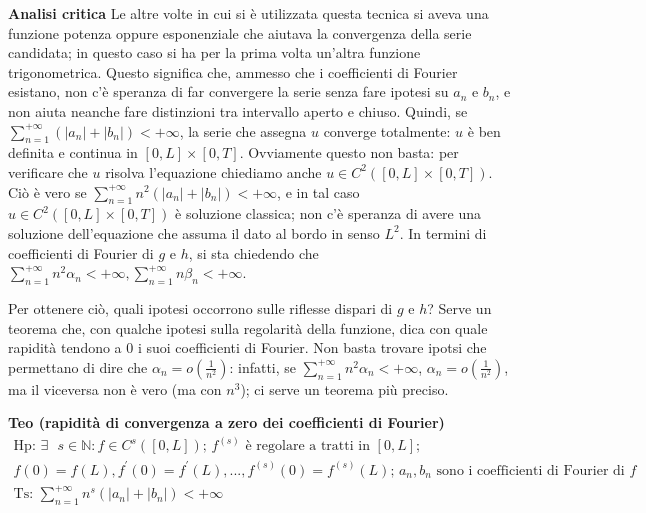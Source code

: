 \documentclass{article}
\begin{document}
\textbf{Analisi critica} Le altre volte in cui si \`{e} utilizzata questa
tecnica si aveva una funzione potenza oppure esponenziale che aiutava la
convergenza della serie candidata; in questo caso si ha per la prima volta
un'altra funzione trigonometrica. Questo significa che, ammesso che i
coefficienti di Fourier esistano, non c'\`{e} speranza di far convergere la
serie senza fare ipotesi su $a_{n}$ e $b_{n}$, e non aiuta neanche fare
distinzioni tra intervallo aperto e chiuso. Quindi, se $\sum_{n=1}^{+\infty
}\left( \left\vert a_{n}\right\vert +\left\vert b_{n}\right\vert \right)
<+\infty $, la serie che assegna $u$ converge totalmente: $u$ \`{e} ben
definita e continua in $\left[ 0,L\right] \times \left[ 0,T\right] $.
Ovviamente questo non basta: per verificare che $u$ risolva l'equazione
chiediamo anche $u\in C^{2}\left( \left[ 0,L\right] \times \left[ 0,T\right]
\right) $. Ci\`{o} \`{e} vero se $\sum_{n=1}^{+\infty }n^{2}\left(
\left\vert a_{n}\right\vert +\left\vert b_{n}\right\vert \right) <+\infty $,
e in tal caso $u\in C^{2}\left( \left[ 0,L\right] \times \left[ 0,T\right]
\right) $ \`{e} soluzione classica; non c'\`{e} speranza di avere una
soluzione dell'equazione che assuma il dato al bordo in senso $L^{2}$. In
termini di coefficienti di Fourier di $g$ e $h$, si sta chiedendo che $%
\sum_{n=1}^{+\infty }n^{2}\alpha _{n}<+\infty ,\sum_{n=1}^{+\infty }n\beta
_{n}<+\infty $.

Per ottenere ci\`{o}, quali ipotesi occorrono sulle riflesse dispari di $g$
e $h$? Serve un teorema che, con qualche ipotesi sulla regolarit\`{a} della
funzione, dica con quale rapidit\`{a} tendono a $0$ i suoi coefficienti di
Fourier. Non basta trovare ipotsi che permettano di dire che $\alpha
_{n}=o\left( \frac{1}{n^{2}}\right) $: infatti, se $\sum_{n=1}^{+\infty
}n^{2}\alpha _{n}<+\infty $, $\alpha _{n}=o\left( \frac{1}{n^{2}}\right) $,
ma il viceversa non \`{e} vero (ma con $n^{3}$); ci serve un teorema pi\`{u}
preciso.

\textbf{Teo (rapidit\`{a} di convergenza a zero dei coefficienti di Fourier)}%
\begin{gather*}
\text{Hp: }\exists \text{ }s\in 
\mathbb{N}
:f\in C^{s}\left( \left[ 0,L\right] \right) \text{; }f^{\left( s\right) }%
\text{ \`{e} regolare a tratti in }\left[ 0,L\right] \text{;} \\
f\left( 0\right) =f\left( L\right) ,f^{\prime }\left( 0\right) =f^{\prime
}\left( L\right) ,...,f^{\left( s\right) }\left( 0\right) =f^{\left(
s\right) }\left( L\right) \text{; }a_{n},b_{n}\text{ sono i coefficienti di
Fourier di }f \\
\text{Ts: }\sum_{n=1}^{+\infty }n^{s}\left( \left\vert a_{n}\right\vert
+\left\vert b_{n}\right\vert \right) <+\infty
\end{gather*}
\end{document}
